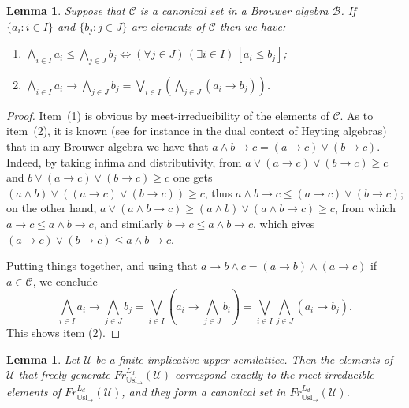 \documentclass[11pt]{amsart}
\newtheorem{lemma}[theorem]{Lemma}
\newcommand{\Usl}{\mathbb{U}\textrm{sl}}
\newcommand{\QA}[1]{(\forall{#1})\,}
\newcommand{\QE}[1]{(\exists{#1})\,}
\begin{document}
\begin{lemma}\label{lem:canonical-new}
Suppose that $\mathscr{C}$ is a canonical set in a Brouwer algebra 
$\mathscr{B}$. If $\{a_i: i\in I\}$ and $\{b_j: j\in J\}$ are elements of 
$\mathscr{C}$ then we have: 
\begin{enumerate}
  \item $\bigwedge_{i \in I} a_i \leq \bigwedge_{j \in J} b_j 
      \Leftrightarrow \QA{j\in J}\QE{i \in I}[a_i \leq b_j]$; 
  \item $\bigwedge_{i\in I} a_i \rightarrow \bigwedge_{j \in J} b_j = 
      \bigvee_{i\in I}\left( \bigwedge_{j \in J} (a_i \rightarrow 
      b_j)\right)$. 
\end{enumerate}
\end{lemma}
\begin{proof} 
Item~(1) is obvious by meet-irreducibility of the elements of $\mathscr{C}$. 
As to item~(2), it is known (see for instance \cite[IX~\S2.~Theorem~3(ix)]{BalbesDwinger} in the dual context of Heyting 
algebras) that in any Brouwer algebra we have that $a\wedge b \rightarrow c= 
(a \rightarrow c) \lor (b \rightarrow c)$. Indeed, by taking infima and 
distributivity, from $a \lor (a\rightarrow c)\lor (b \rightarrow c)\ge c$ and 
$b \lor (a\rightarrow c)\lor (b \rightarrow c)\ge c$ one gets $(a\wedge 
b)\lor ((a\rightarrow c) \lor (b \rightarrow c))\ge c$, thus $a \wedge b 
\rightarrow c \leq (a\rightarrow c)\lor (b \rightarrow c)$; on the other 
hand, $a \lor (a\wedge b \rightarrow c) \ge (a \wedge b)\lor (a\wedge b 
\rightarrow c) \ge c$, from which $a \rightarrow c \leq a\wedge b \rightarrow 
c$, and similarly $b \rightarrow c \leq a\wedge b \rightarrow c$, which gives 
$(a \rightarrow c) \lor (b \rightarrow c) \leq a\wedge b \rightarrow c$. 

Putting things together, and using that $a \rightarrow b \wedge c= (a 
\rightarrow b) \wedge (a \rightarrow c)$ if $a\in \mathscr{C}$, we conclude 
\[
\bigwedge_{i\in I} a_i \rightarrow \bigwedge_{j \in J} b_j = 
      \bigvee_{i\in I} \left(a_i \rightarrow \bigwedge_{j \in J} b_i\right)= 
      \bigvee_{i\in I} \bigwedge_{j \in J} (a_i \rightarrow b_j). 
\] 
This shows item (2).
\end{proof}


\begin{lemma}\label{lem:free-can}
Let $\mathscr{U}$ be a finite implicative upper semilattice. Then the  
elements of $\mathscr{U}$ that freely generate 
$Fr^{L_d}_{\Usl_{\rightarrow}}(\mathscr{U})$ correspond exactly to the 
meet-irreducible elements of $Fr^{L_d}_{\Usl_{\rightarrow}}(\mathscr{U})$, 
and they form a canonical set in $Fr^{L_d}_{\Usl_{\rightarrow}}(\mathscr{U})$. 
\end{lemma}
\end{document}
